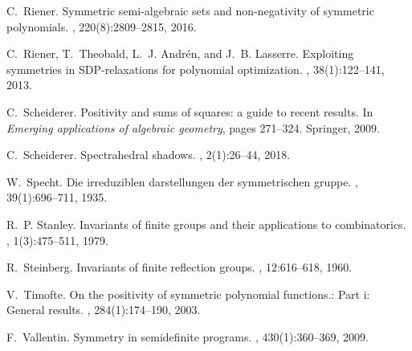 \documentclass[11pt,a4paper]{amsart}
\numberwithin{equation}{section}
\theoremstyle{definition}
\numberwithin{thm}{section}
\theoremstyle{break}
\numberwithin{subcase}{case}
\begin{document}
\begin{thebibliography}{10}
C.~Riener.
\newblock Symmetric semi-algebraic sets and non-negativity of symmetric
  polynomials.
, 220(8):2809--2815, 2016.

C.~Riener, T.~Theobald, L.~J. Andr{\'e}n, and J.~B. Lasserre.
\newblock Exploiting symmetries in SDP-relaxations for polynomial optimization.
, 38(1):122--141, 2013.

C.~Scheiderer.
\newblock Positivity and sums of squares: a guide to recent results.
\newblock In {\em Emerging applications of algebraic geometry}, pages 271--324.
  Springer, 2009.

C.~Scheiderer.
\newblock Spectrahedral shadows.
, 2(1):26--44,
  2018.

W.~Specht.
\newblock Die irreduziblen darstellungen der symmetrischen gruppe.
, 39(1):696--711, 1935.

R.~P. Stanley.
\newblock Invariants of finite groups and their applications to combinatorics.
, 1(3):475--511,
  1979.

R.~Steinberg.
\newblock Invariants of finite reflection groups.
, 12:616--618, 1960.

V.~Timofte.
\newblock On the positivity of symmetric polynomial functions.: Part i: General
  results.
,
  284(1):174--190, 2003.

F.~Vallentin.
\newblock Symmetry in semidefinite programs.
, 430(1):360--369, 2009.

\end{thebibliography}
\end{document}
